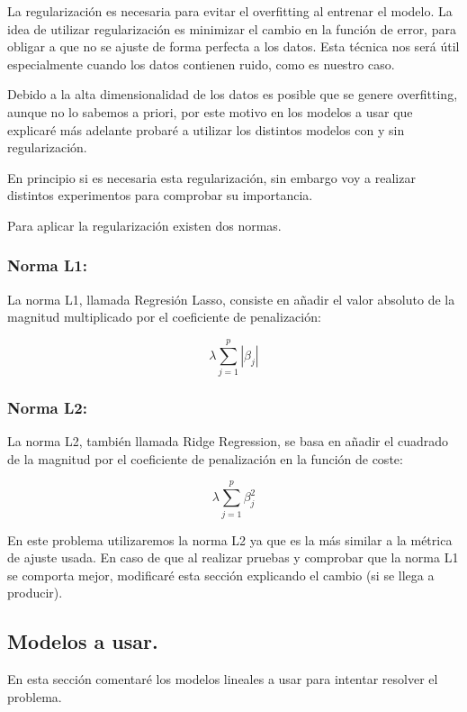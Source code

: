 \documentclass[12pt, spanish]{article}
\begin{document}
La regularización es necesaria para evitar el overfitting al entrenar el modelo. La idea de utilizar regularización es minimizar el cambio en la función de error, para obligar a que no se ajuste de forma perfecta a los datos. Esta técnica nos será útil especialmente cuando los datos contienen ruido, como es nuestro caso.

Debido a la alta dimensionalidad de los datos es posible que se genere overfitting, aunque no lo sabemos a priori, por este motivo en los modelos a usar que explicaré más adelante probaré a utilizar los distintos modelos con y sin regularización.

En principio si es necesaria esta regularización, sin embargo voy a realizar distintos experimentos para comprobar su importancia.

Para aplicar la regularización existen dos normas\cite{l1l2regularizacion}.


\subsubsection{Norma L1: }

La norma L1, llamada Regresión Lasso, consiste en añadir el valor absoluto de la magnitud multiplicado por el coeficiente de penalización:

$$ \lambda \sum_{j=1}^{p}{|\beta_j|} $$

\subsubsection{Norma L2:}

La norma L2, también llamada Ridge Regression, se basa en añadir el cuadrado de la magnitud por el coeficiente de penalización en la función de coste:

$$ \lambda \sum_{j=1}^{p}{\beta_j^2} $$


En este problema utilizaremos la norma L2 ya que es la más similar a la métrica de ajuste usada. En caso de que al realizar pruebas y comprobar que la norma L1 se comporta mejor, modificaré esta sección explicando el cambio (si se llega a producir).

\newpage

\subsection{Modelos a usar.}

En esta sección comentaré los modelos lineales a usar para intentar resolver el problema.
\end{document}
